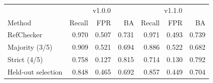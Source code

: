 \begin{tabular}{@{}lrrrrrr@{}}\toprule
 & \multicolumn{3}{c}{v1.0.0} & \multicolumn{3}{c}{v1.1.0} \\
Method & Recall & FPR & BA & Recall & FPR & BA \\
\midrule
RefChecker & 0.970 & 0.507 & 0.731 & 0.971 & 0.493 & 0.739 \\
Majority (3/5) & 0.909 & 0.521 & 0.694 & 0.886 & 0.522 & 0.682 \\
Strict (4/5) & 0.758 & 0.127 & 0.815 & 0.714 & 0.130 & 0.792 \\
Held-out selection & 0.848 & 0.465 & 0.692 & 0.857 & 0.449 & 0.704 \\
\bottomrule\end{tabular}
